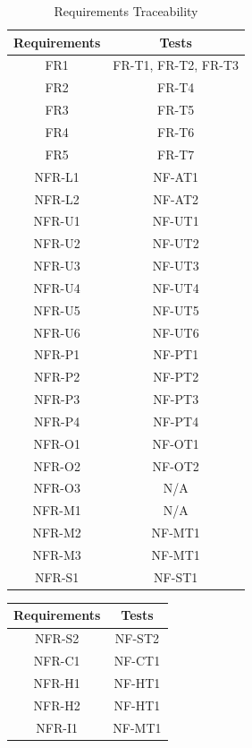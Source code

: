 \documentclass[12pt, titlepage]{article}
\begin{document}
\begin{table}[H]
	\centering
	\caption{Requirements Traceability}
	\label{my-label}
	\begin{tabular}{|c|c|}
		\hline
		\textbf{Requirements} & \textbf{Tests} \\ \hline
		FR1 & FR-T1, FR-T2, FR-T3 \\ \hline
		FR2 & FR-T4 \\ \hline
		FR3 & FR-T5 \\ \hline
		FR4 & FR-T6 \\ \hline
		FR5 & FR-T7 \\ \hline
		NFR-L1 & NF-AT1 \\ \hline
    NFR-L2 & NF-AT2 \\ \hline
    NFR-U1 & NF-UT1 \\ \hline
    NFR-U2 & NF-UT2 \\ \hline
    NFR-U3 & NF-UT3 \\ \hline
    NFR-U4 & NF-UT4 \\ \hline
    NFR-U5 & NF-UT5\\ \hline
    NFR-U6 & NF-UT6 \\ \hline
    NFR-P1 & NF-PT1 \\ \hline
    NFR-P2 & NF-PT2 \\ \hline
    NFR-P3 & NF-PT3 \\ \hline
    NFR-P4 & NF-PT4 \\ \hline
    NFR-O1 & NF-OT1 \\ \hline
    NFR-O2 & NF-OT2 \\ \hline
    NFR-O3 & N/A \\ \hline
    NFR-M1 & N/A \\ \hline
    NFR-M2 & NF-MT1 \\ \hline
    NFR-M3 & NF-MT1 \\ \hline
    NFR-S1 & NF-ST1 \\ \hline
	\end{tabular}
\end{table}

\newpage

\begin{table}[H]
	\centering
	\begin{tabular}{|c|c|}
		\hline
		\textbf{Requirements} & \textbf{Tests} \\ \hline
    NFR-S2 & NF-ST2 \\ \hline
    NFR-C1 & NF-CT1 \\ \hline
    NFR-H1 & NF-HT1 \\ \hline
    NFR-H2 & NF-HT1 \\ \hline
    NFR-I1 & NF-MT1 \\ \hline
	\end{tabular}
\end{table}
\end{document}
